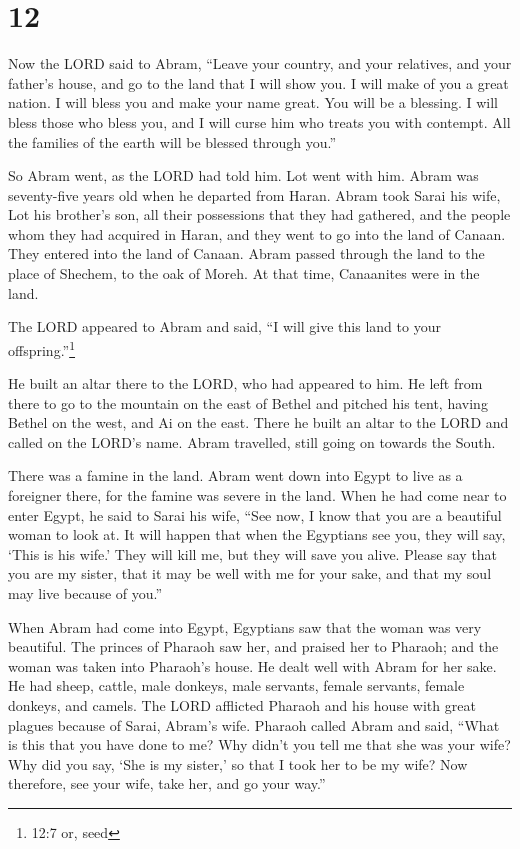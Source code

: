 \hypertarget{section-11}{%
\section{12}\label{section-11}}

 Now the LORD said to Abram, ``Leave your country, and your
relatives, and your father's house, and go to the land that I will show
you.  I will make of you a great nation. I will bless you
and make your name great. You will be a blessing.  I will
bless those who bless you, and I will curse him who treats you with
contempt. All the families of the earth will be blessed through you.''

 So Abram went, as the LORD had told him. Lot went with him.
Abram was seventy-five years old when he departed from Haran.
 Abram took Sarai his wife, Lot his brother's son, all their
possessions that they had gathered, and the people whom they had
acquired in Haran, and they went to go into the land of Canaan. They
entered into the land of Canaan.  Abram passed through the
land to the place of Shechem, to the oak of Moreh. At that time,
Canaanites were in the land.

 The LORD appeared to Abram and said, ``I will give this
land to your offspring.''\footnote{12:7 or, seed}

He built an altar there to the LORD, who had appeared to him.
 He left from there to go to the mountain on the east of
Bethel and pitched his tent, having Bethel on the west, and Ai on the
east. There he built an altar to the LORD and called on the LORD's name.
 Abram travelled, still going on towards the South.

 There was a famine in the land. Abram went down into Egypt
to live as a foreigner there, for the famine was severe in the land.
 When he had come near to enter Egypt, he said to Sarai his
wife, ``See now, I know that you are a beautiful woman to look at.
 It will happen that when the Egyptians see you, they will
say, `This is his wife.' They will kill me, but they will save you
alive.  Please say that you are my sister, that it may be
well with me for your sake, and that my soul may live because of you.''

 When Abram had come into Egypt, Egyptians saw that the
woman was very beautiful.  The princes of Pharaoh saw her,
and praised her to Pharaoh; and the woman was taken into Pharaoh's
house.  He dealt well with Abram for her sake. He had
sheep, cattle, male donkeys, male servants, female servants, female
donkeys, and camels.  The LORD afflicted Pharaoh and his
house with great plagues because of Sarai, Abram's wife. 
Pharaoh called Abram and said, ``What is this that you have done to me?
Why didn't you tell me that she was your wife?  Why did you
say, `She is my sister,' so that I took her to be my wife? Now
therefore, see your wife, take her, and go your way.''

